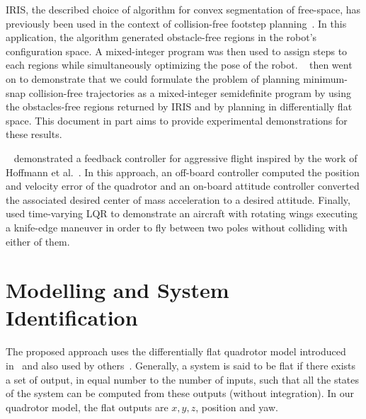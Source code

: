 IRIS, the described choice of algorithm for convex segmentation
of free-space, has previously been used in the context of
collision-free footstep planning~\cite{deits2014convex}. In this application, the algorithm generated obstacle-free regions in the robot’s configuration space. A mixed-integer program was then used to assign steps to each regions while simultaneously optimizing the pose of the robot. ~\cite{deits2015efficient} then went on to demonstrate that
we could formulate the problem of planning minimum-snap
collision-free trajectories as a mixed-integer semidefinite
program by using the obstacles-free regions returned by IRIS
and by planning in differentially flat space. This document in
part aims to provide experimental demonstrations for these
results.

~\cite{mellinger2012trajectory} demonstrated a feedback controller for aggressive flight inspired by the work of Hoffmann et al.~\cite{hoffmann2008quadrotor}. In this approach,
an off-board controller computed the position and velocity
error of the quadrotor and an on-board attitude controller
converted the associated desired center of mass acceleration
to a desired attitude. Finally,~\cite{barry2012flying} used time-varying LQR to demonstrate an aircraft with rotating wings executing a knife-edge maneuver in order to fly between two poles without colliding with either of them. 


\section{Modelling and System Identification}
The proposed approach uses the differentially flat quadrotor model introduced
in~\cite{mellinger2011minimum} and also used by others~\cite{richter2013polynomial}. Generally, a system is said to be flat if there exists a set of output, in equal number to
the number of inputs, such that all the states of the system
can be computed from these outputs (without integration).
In our quadrotor model, the flat outputs are $x, y, z$, position and yaw.

